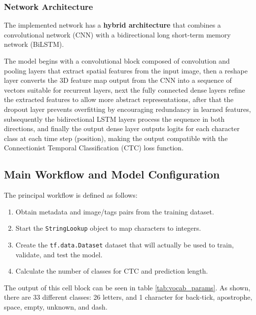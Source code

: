 \documentclass[11pt,letterpaper]{article}
\begin{document}
	\subsubsection{Network Architecture}
	The implemented network has a \textbf{hybrid architecture} that combines a convolutional network (CNN) with a bidirectional long short-term memory network (BiLSTM).
	
	The model begins with a convolutional block composed of convolution and pooling layers that extract spatial features from the input image, then a reshape layer converts the 3D feature map output from the CNN into a sequence of vectors suitable for recurrent layers, next the fully connected dense layers refine the extracted features to allow more abstract representations, after that the dropout layer prevents overfitting by encouraging redundancy in learned features, subsequently the bidirectional LSTM layers process the sequence in both directions, and finally the output dense layer outputs logits for each character class at each time step (position), making the output compatible with the Connectionist Temporal Classification (CTC) loss function.
	
	\subsection{Main Workflow and Model Configuration}
	The principal workflow is defined as follows:
	\begin{enumerate}
		\item Obtain metadata and image/tags pairs from the training dataset.
		\item Start the \texttt{StringLookup} object to map characters to integers.
		\item Create the \texttt{tf.data.Dataset} dataset that will actually be used to train, validate, and test the model.
		\item Calculate the number of classes for CTC and prediction length.
	\end{enumerate}
	
	The output of this cell block can be seen in table \ref{tab:vocab_params}. As shown, there are 33 different classes: 26 letters, and 1 character for back-tick, apostrophe, space, empty, unknown, and dash.
	
\end{document}
